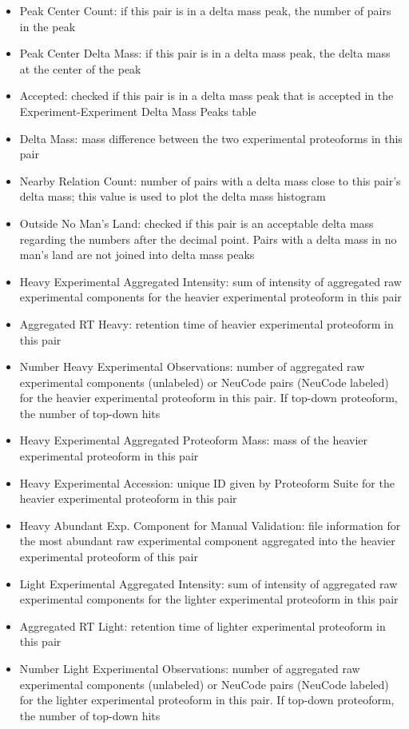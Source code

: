 \begin{itemize}
\begin{itemize}
	\item Peak Center Count: if this pair is in a delta mass peak, the number of pairs in the peak
	\item Peak Center Delta Mass: if this pair is in a delta mass peak, the delta mass at the center of the peak
	\item Accepted: checked if this pair is in a delta mass peak that is accepted in the Experiment-Experiment Delta Mass Peaks table
	\item Delta Mass: mass difference between the two experimental proteoforms in this pair
	\item Nearby Relation Count: number of pairs with a delta mass close to this pair's delta mass; this value is used to plot the delta mass histogram
	\item Outside No Man's Land: checked if this pair is an acceptable delta mass regarding the numbers after the decimal point. Pairs with a delta mass in no man's land are not joined into delta mass peaks
	\item Heavy Experimental Aggregated Intensity: sum of intensity of aggregated raw experimental components for the heavier experimental proteoform in this pair
	\item Aggregated RT Heavy: retention time of heavier experimental proteoform in this pair
	\item Number Heavy Experimental Observations: number of aggregated raw experimental components (unlabeled) or NeuCode pairs (NeuCode labeled) for the heavier experimental proteoform in this pair. If top-down proteoform, the number of top-down hits
	\item Heavy Experimental Aggregated Proteoform Mass: mass of the heavier experimental proteoform in this pair
	\item Heavy Experimental Accession: unique ID given by Proteoform Suite for the heavier experimental proteoform in this pair		
	\item Heavy Abundant Exp. Component for Manual Validation: file information for the most abundant raw experimental component aggregated into the heavier experimental proteoform of this pair
	\item Light Experimental Aggregated Intensity: sum of intensity of aggregated raw experimental components for the lighter experimental proteoform in this pair
	\item Aggregated RT Light: retention time of lighter experimental proteoform in this pair
	\item Number Light Experimental Observations: number of aggregated raw experimental components (unlabeled) or NeuCode pairs (NeuCode labeled) for the lighter experimental proteoform in this pair. If top-down proteoform, the number of top-down hits

\end{itemize}
\end{itemize}
